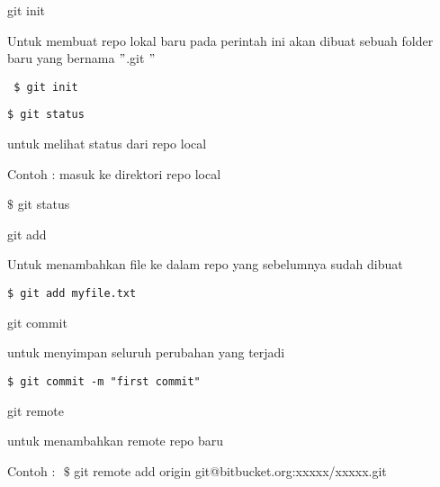 \noindent 
git init $  $ \par
\noindent 
\vspace{\baselineskip}
Untuk membuat repo lokal baru pada perintah ini akan dibuat sebuah folder baru yang bernama  $ " $.git $ " $ \par
\noindent 
\vspace{\baselineskip}
\begin{verbatim}
 $ git init
\end{verbatim}
\begin{verbatim}
$ git status
\end{verbatim}
\vspace{\baselineskip}
untuk melihat status dari repo local \par
\noindent 
\vspace{\baselineskip}
Contoh : masuk ke direktori repo local \par
\noindent 
\vspace{\baselineskip}
 $  \$  $ git status \par
\vspace{12pt}
\noindent 
git add $  $ \par
\noindent 
\vspace{\baselineskip}
Untuk menambahkan file ke dalam repo yang sebelumnya sudah dibuat \par
\noindent 
\vspace{\baselineskip}
\begin{verbatim}
$ git add myfile.txt
\end{verbatim}
\vspace{12pt}
\noindent 
git commit \par
\noindent 
\vspace{\baselineskip}
untuk menyimpan seluruh perubahan yang terjadi \par
\noindent 
\vspace{\baselineskip}
\begin{verbatim}
$ git commit -m "first commit"
\end{verbatim}\vspace{12pt}
\noindent 
git remote $  $ \par
\noindent 
\vspace{\baselineskip}
untuk menambahkan remote repo baru \par
\noindent 
\vspace{\baselineskip}
Contoh : $  $ $  \$  $ git remote add origin git@bitbucket.org:xxxxx/xxxxx.git \par
\vspace{12pt}
